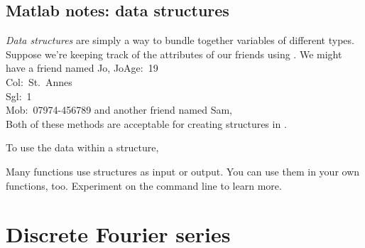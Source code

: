 \documentclass[12pt,twoside,a4paper]{article}
\begin{document}
\subsection*{Matlab notes: data structures}

\textit{Data structures} are simply a way to bundle together variables
of different types.  Suppose we're keeping track of the attributes of
our friends using \Mlab.  We might have a friend named Jo,
{Jo}{Age:~19\\Col:~\qu{}St.~Annes\qu{}\\Sgl:~1\\Mob:~\qu{}07974-456789\qu{}}
and another friend named Sam,   
\\
Both of these methods are acceptable for creating structures in \Mlab.

To use the data within a structure, 

Many \Mlab functions use structures as input or output. You can use
them in your own functions, too. Experiment on the command line to
learn more.

\section{Discrete Fourier series}
\end{document}
